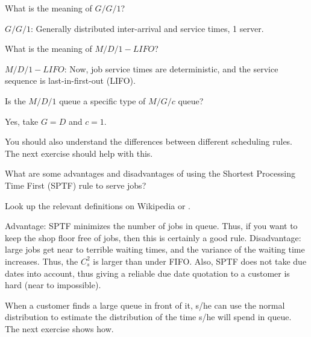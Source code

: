 \begin{extra}
 What is the meaning of $G/G/1$?
\begin{solution}
 $G/G/1$: Generally distributed inter-arrival and service times, 1 server.
\end{solution}
\end{extra}

\begin{extra}
 What is the meaning of $M/D/1-LIFO$?
\begin{solution}
 $M/D/1-LIFO$: Now, job service times are deterministic, and the service sequence is last-in-first-out (LIFO).
\end{solution}
\end{extra}

\begin{exercise}
 Is the $M/D/1$ queue a specific type of $M/G/c$ queue? 
\begin{solution}
 Yes, take $G=D$ and $c=1$. 
\end{solution}
\end{exercise}

You should also understand the differences between  different scheduling rules. The next exercise should help with this. 

\begin{exercise}
 What are some advantages and disadvantages of using the Shortest Processing Time First (SPTF) rule to serve jobs?
\begin{hint}
Look up the relevant
 definitions on Wikipedia or
 \citet{hall91:_queuein_method_servic_manuf}.
\end{hint}
\begin{solution}
 Advantage: SPTF minimizes the number of jobs in queue.
 Thus, if you want to keep the shop floor free of jobs, then this is certainly a good rule.
 Disadvantage: large jobs get near to terrible waiting times, and the variance of the waiting time increases.
 Thus, the $C_s^2$ is larger than under FIFO.
 Also, SPTF does not take due dates into account, thus giving a reliable due date quotation to a customer is hard (near to impossible).
\end{solution}
\end{exercise}

When a customer finds a large queue in front of it, s/he can use the normal distribution to estimate the distribution of the time s/he will spend in queue.  The next exercise shows how. 


